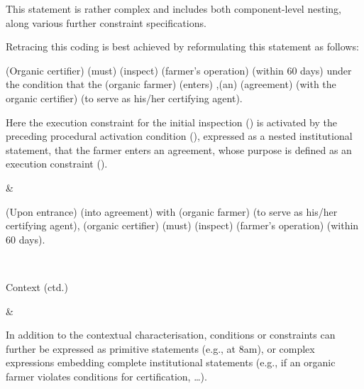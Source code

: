 \begin{landscape}
\begin{longtable}{\tabledims}
\sp

This statement is rather complex and includes both component-level nesting, along various further constraint specifications.

\sp

Retracing this coding is best achieved by reformulating this statement as follows:

\sp

\begin{exi}\A{}(Organic certifier) \D{}(must) \I{}(inspect) \Bdir{}(farmer's operation) \Cex{}(within 60 days)  \Cac{}\lb under the condition that the \A{}(organic farmer) \I{}(enters) \Bdir{},\prop{}(an) \Bdir{}(agreement) \Bind{}(with the organic certifier) \Cex{}(to serve as his/her certifying agent)\rb.\end{exi}

\sp

Here the execution constraint for the initial inspection (\Cex{}) is activated by the preceding procedural activation condition (\Cac{}), expressed as a nested institutional statement, that the farmer enters an agreement, whose purpose is defined as an execution constraint (\Cex{}).

\sp


&

\vspace{0.05cm}

\begin{exi}\Cac{}\lb \I{}(Upon entrance) \Bdir{}(into agreement) with \A{}(organic farmer) \Cex{}(to serve as his/her certifying agent)\rb, \A{}(organic certifier) \D{}(must) \I{}(inspect) \Bdir{}(farmer's operation) \Cex{}(within 60 days).\end{exi}

\\

\begin{emp}Context (ctd.)\end{emp}

&

In addition to the contextual characterisation, conditions or constraints can further be expressed as primitive statements (e.g., at 8am), or complex expressions embedding complete institutional statements (e.g., if an organic farmer violates conditions for certification, \dots).

\sp


\end{longtable}
\end{landscape}
